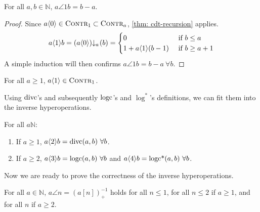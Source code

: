 \begin{lem}
For all $a, b\in \mathbb{N}$, $a\angle{1}b = b - a$.
\end{lem}
\begin{proof}
Since $a\langle 0\rangle \in \text{\scshape{Contr}}_1 \subset \text{\scshape{Contr}}_{a}$, \cref{thm: cdt-recursion} applies.
\begin{equation*}
a\angle{1}b = \cdt{\left(a\angle{0}\right)}{a}(b) = \begin{cases}
0 & \text{ if } b\le a \\ 1 + a\angle{1}(b - 1) & \text{ if } b\ge a+1
\end{cases}
\end{equation*}
A simple induction will then confirms $a\angle{1}b = b - a \ \forall b$.
\end{proof}
\begin{col} \label{col: inv-hyperop-1-contr1}
For all $a\ge 1$, $a\langle 1\rangle \in \text{\scshape{Contr}}_1$.
\end{col}
Using $\text{divc}$'s and subsequently $\text{logc}$'s and $\log^*$'s definitions, we can fit them into the inverse hyperoperations.
\begin{col} \label{col: inv-hyperop-234}
For all $a \mathbb{N}$:
\begin{enumerate}
	\item If $a\ge 1$, $a\langle 2\rangle b = \text{divc}(a, b) \ \forall b$.
	\item If $a\ge 2$, $a\langle 3\rangle b = \text{logc}(a, b) \ \forall b$ and $a\langle 4\rangle b = \text{logc*}(a, b) \ \forall b$.
\end{enumerate}
\end{col}
Now we are ready to prove the correctness of the inverse hyperoperations.
\begin{thm} \label{thm: inv-hyperop-correct}
For all $a\in \mathbb{N}$, $a\angle{n} = \left(a[n]\right)^{-1}_+$ holds for all $n\le 1$, for all $n \le 2$ if $a\ge 1$, and for all $n$ if $a\ge 2$.
\end{thm}
